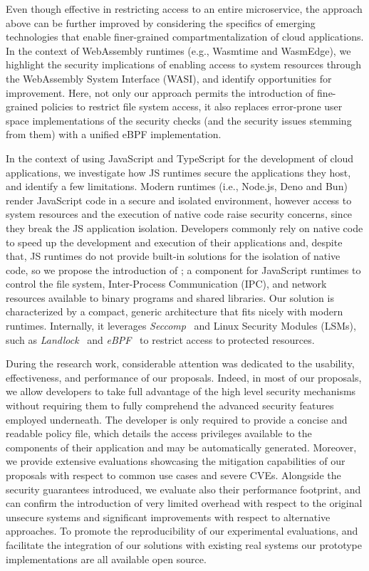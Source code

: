 Even though effective in restricting access to an entire microservice,
the approach above can be further improved by considering the
specifics of emerging technologies that enable finer-grained
compartmentalization of cloud applications. In the context of
WebAssembly runtimes (e.g., Wasmtime and WasmEdge), we highlight the
security implications of enabling access to system resources through
the WebAssembly System Interface (WASI), and identify opportunities
for improvement. Here, not only our approach permits the introduction of
fine-grained policies to restrict file system access, it also replaces
error-prone user space implementations of the security checks (and the
security issues stemming from them) with a unified eBPF
implementation.

In the context of using JavaScript and TypeScript for the development
of cloud applications, we investigate how JS runtimes secure the
applications they host, and identify a few limitations. Modern
runtimes (i.e., Node.js, Deno and Bun) render JavaScript code in a
secure and isolated environment, however access to system resources
and the execution of native code raise security concerns, since they
break the JS application isolation. Developers commonly rely on native
code to speed up the development and execution of their applications
and, despite that, JS runtimes do not provide built-in solutions for
the isolation of native code, so we propose the introduction of
\natisand; a component for JavaScript runtimes to control the
file system, Inter-Process Communication (IPC), and network resources
available to binary programs and shared libraries. Our solution is
characterized by a compact, generic architecture that fits nicely with
modern runtimes. Internally, it leverages {\em
  Seccomp}~\cite{seccompbpf} and Linux Security Modules (LSMs), such
as {\em Landlock}~\cite{landlock} and {\em eBPF}~\cite{corbet2014eBPF}
to restrict access to protected resources.

During the research work, considerable attention was dedicated to the
usability, effectiveness, and performance of our proposals. Indeed, in
most of our proposals, we allow developers to take full advantage of
the high level security mechanisms without requiring them to fully
comprehend the advanced security features employed underneath. The
developer is only required to provide a concise and readable policy
file, which details the access privileges available to the components
of their application and may be automatically generated. Moreover, we
provide extensive evaluations showcasing the mitigation capabilities
of our proposals with respect to common use cases and severe CVEs.
Alongside the security guarantees introduced, we evaluate also their
performance footprint, and can confirm the introduction of very
limited overhead with respect to the original unsecure systems and
significant improvements with respect to alternative approaches. To
promote the reproducibility of our experimental evaluations, and
facilitate the integration of our solutions with existing real systems
our prototype implementations are all available open source.

